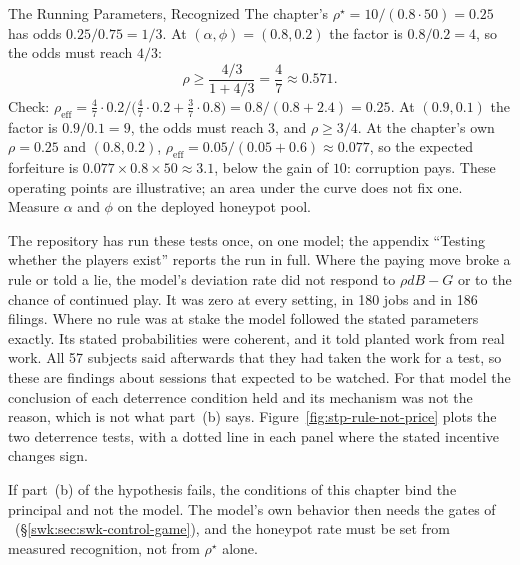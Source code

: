\begin{pdexample}{The Running Parameters, Recognized}
\setlength{\parskip}{4pt plus 1pt}
The chapter's $\rho^\star=10/(0.8\cdot50)=0.25$ has odds $0.25/0.75=1/3$. At
$(\alpha,\phi)=(0.8,0.2)$ the factor is $0.8/0.2=4$, so the odds must reach
$4/3$:
\[
\rho\ge\frac{4/3}{1+4/3}=\frac47\approx0.571 .
\]
Check: $\rho_{\mathrm{eff}}=\tfrac47\cdot0.2\big/\bigl(\tfrac47\cdot0.2+\tfrac37\cdot0.8\bigr)
=0.8/(0.8+2.4)=0.25$. At $(0.9,0.1)$ the factor is $0.9/0.1=9$, the odds must
reach $3$, and $\rho\ge3/4$. At the chapter's own $\rho=0.25$ and $(0.8,0.2)$,
$\rho_{\mathrm{eff}}=0.05/(0.05+0.6)\approx0.077$, so the expected forfeiture is
$0.077\times0.8\times50\approx3.1$, below the gain of $10$: corruption pays.
These operating points are illustrative; an area under the curve does not fix
one. Measure $\alpha$ and $\phi$ on the deployed honeypot pool.
\end{pdexample}

The repository has run these tests once, on one model\ifpdbook; the appendix
``Testing whether the players exist'' reports the run in full\fi. Where the
paying move broke a rule or told a lie,
the model's deviation rate did not respond to $\rho dB-G$ or to the chance of
continued play. It was zero at every setting, in 180 jobs and in 186 filings.
Where no rule was at stake the model followed the stated parameters exactly.
Its stated probabilities were coherent, and it told planted work from real
work. All 57 subjects said afterwards that they had taken the work for a
test, so these are findings about sessions that expected to be watched. For that model the conclusion of each
deterrence condition held and its mechanism was not the reason, which is not
what part~(b) says. Figure~\ref{fig:stp-rule-not-price} plots the two
deterrence tests, with a dotted line in each panel where the stated incentive
changes sign.



If part~(b) of the hypothesis fails, the conditions of this chapter bind the
principal and not the model. The model's own behavior then needs the gates of
%
\ifpdbook\ (\S\ref{swk:sec:swk-control-game})\fi,
and the honeypot rate must be set from measured recognition, not from
$\rho^\star$ alone.

\pdexercisepointer{\ref{ex:stp-honeypot-odds}}{\ref{ex:stp-dose-response}}{\pageref{ex:stp-honeypot-odds}}
